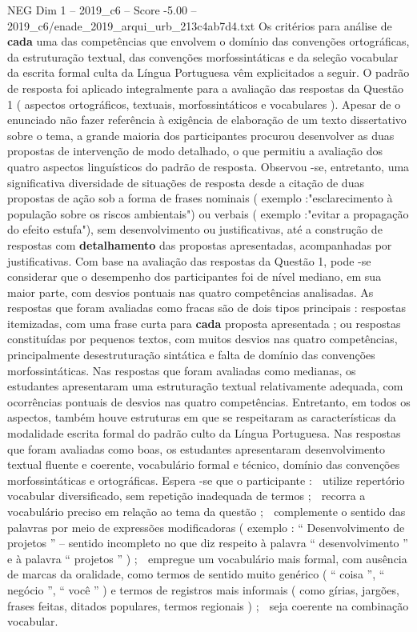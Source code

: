 \begin{textsample}{NEG Dim 1 – 2019\_c6 – Score -5.00 – 2019\_c6/enade\_2019\_arqui\_urb\_213c4ab7d4.txt}
Os critérios para análise de \textbf{cada} uma das competências que envolvem o domínio das convenções ortográficas, da estruturação textual, das convenções morfossintáticas e da seleção vocabular da escrita formal culta da Língua Portuguesa vêm explicitados a seguir.
O padrão de resposta foi aplicado integralmente para a avaliação das respostas da Questão 1 ( aspectos ortográficos, textuais, morfossintáticos e vocabulares ).
Apesar de o enunciado não fazer referência à exigência de elaboração de um texto dissertativo sobre o tema, a grande maioria dos participantes procurou desenvolver as duas propostas de intervenção de modo detalhado, o que permitiu a avaliação dos quatro aspectos linguísticos do padrão de resposta.
Observou -se, entretanto, uma significativa diversidade de situações de resposta desde a citação de duas propostas de ação sob a forma de frases nominais ( exemplo :"esclarecimento à população sobre os riscos ambientais") ou verbais ( exemplo :"evitar a propagação do efeito estufa"), sem desenvolvimento ou justificativas, até a construção de respostas com \textbf{detalhamento} das propostas apresentadas, acompanhadas por justificativas.
Com base na avaliação das respostas da Questão 1, pode -se considerar que o desempenho dos participantes foi de nível mediano, em sua maior parte, com desvios pontuais nas quatro competências analisadas.
As respostas que foram avaliadas como fracas são de dois tipos principais : respostas itemizadas, com uma frase curta para \textbf{cada} proposta apresentada ; ou respostas constituídas por pequenos textos, com muitos desvios nas quatro competências, principalmente desestruturação sintática e falta de domínio das convenções morfossintáticas.
Nas respostas que foram avaliadas como medianas, os estudantes apresentaram uma estruturação textual relativamente adequada, com ocorrências pontuais de desvios nas quatro competências.
Entretanto, em todos os aspectos, também houve estruturas em que se respeitaram as características da modalidade escrita formal do padrão culto da Língua Portuguesa.
Nas respostas que foram avaliadas como boas, os estudantes apresentaram desenvolvimento textual fluente e coerente, vocabulário formal e técnico, domínio das convenções morfossintáticas e ortográficas.
Espera -se que o participante :  utilize repertório vocabular diversificado, sem repetição inadequada de termos ;  recorra a vocabulário preciso em relação ao tema da questão ;  complemente o sentido das palavras por meio de expressões modificadoras ( exemplo : “ Desenvolvimento de projetos ” – sentido incompleto no que diz respeito à palavra “ desenvolvimento ” e à palavra “ projetos ” ) ;  empregue um vocabulário mais formal, com ausência de marcas da oralidade, como termos de sentido muito genérico ( “ coisa ”, “ negócio ”, “ você ” ) e termos de registros mais informais ( como gírias, jargões, frases feitas, ditados populares, termos regionais ) ;  seja coerente na combinação vocabular.

\end{textsample}
